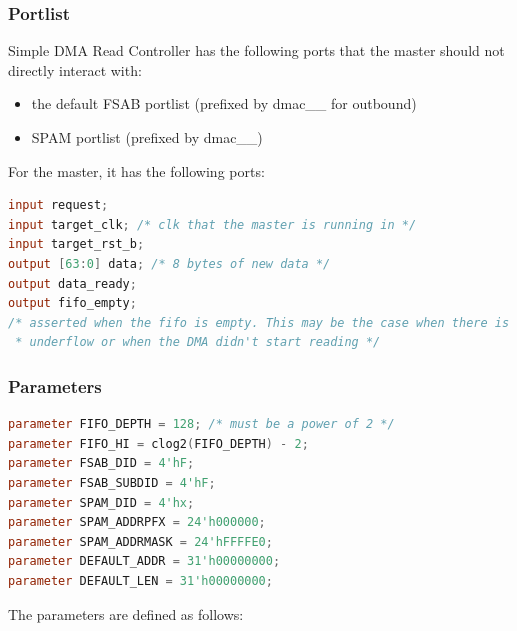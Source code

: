 \documentclass[10pt]{article}
\begin{document}
\subsubsection{Portlist}

Simple DMA Read Controller has the following ports that the master should
not directly interact with:

\begin{itemize}
\item{the default FSAB portlist (prefixed by dmac\_\_ for outbound)}
\item{SPAM portlist (prefixed by dmac\_\_)}
\end{itemize}

For the master, it has the following ports:

\begin{lstlisting}[basicstyle=\footnotesize,language=Verilog]
input request; 
input target_clk; /* clk that the master is running in */
input target_rst_b;
output [63:0] data; /* 8 bytes of new data */
output data_ready;
output fifo_empty; 
/* asserted when the fifo is empty. This may be the case when there is an
 * underflow or when the DMA didn't start reading */
\end{lstlisting}

\subsubsection{Parameters}

\begin{lstlisting}[basicstyle=\footnotesize,language=Verilog]
parameter FIFO_DEPTH = 128; /* must be a power of 2 */
parameter FIFO_HI = clog2(FIFO_DEPTH) - 2;
parameter FSAB_DID = 4'hF;
parameter FSAB_SUBDID = 4'hF;
parameter SPAM_DID = 4'hx;
parameter SPAM_ADDRPFX = 24'h000000;
parameter SPAM_ADDRMASK = 24'hFFFFE0;
parameter DEFAULT_ADDR = 31'h00000000;
parameter DEFAULT_LEN = 31'h00000000;
\end{lstlisting}

The parameters are defined as follows:
\end{document}
